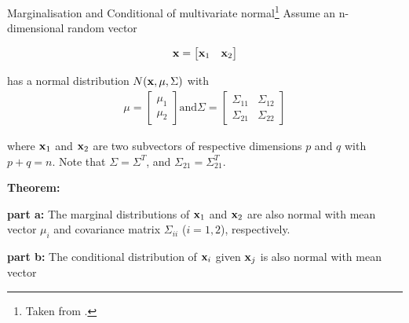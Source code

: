 \documentclass{beamer}
\begin{document}
\begin{frame}{Marginalisation and Conditional of multivariate normal\footnote{Taken from \nodeSeven.}}
Assume an n-dimensional random vector

\begin{equation}
	{\bf x}=\begin{bmatrix}{\bf x}_1 & {\bf x}_2\end{bmatrix} 
\end{equation}

has a normal distribution $N({\bf x},\mu,\Sigma)$ with
\begin{gather}\mu=
	\begin{bmatrix}
		\mu_1 \\
		\mu_2
	\end{bmatrix} 
	\text{and}
	\Sigma = \begin{bmatrix}
		\Sigma_{11}& \Sigma_{12}\\
		\Sigma_{21}&\Sigma_{22}
	\end{bmatrix} 
\end{gather}

where ${\bf x}_1$ and ${\bf x}_2$ are two subvectors of respective dimensions $p$ and $q$ with $p+q=n$. Note that $\Sigma=\Sigma^T$, and $\Sigma_{21}=\Sigma_{21}^T$.
\end{frame}

\begin{frame}
\textbf{Theorem:}

\textbf{part a:} The marginal distributions of ${\bf x}_1$ and ${\bf x}_2$ are also normal with mean vector $\mu_i$ and covariance matrix $\Sigma_{ii}$ ($i=1,2$), respectively.

\textbf{part b:} The conditional distribution of ${\bf x}_i$ given ${\bf x}_j$ is also normal with mean vector

\end{frame}
\end{document}

